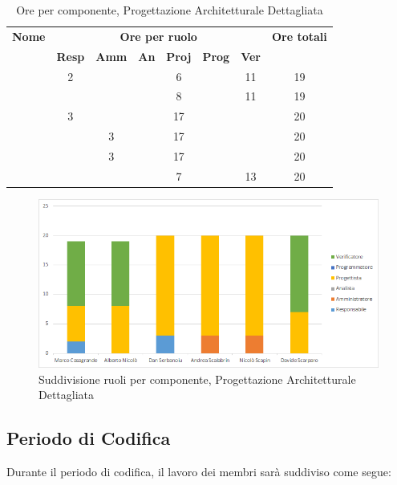 \begin{table}[H]
	\begin{center}
		\begin{tabular}{|c|c|c|c|c|c|c|c|}
			\hline
			\textbf{Nome} & \multicolumn{6}{c|}{\textbf{Ore per ruolo}} & \textbf{Ore totali} \\\cline{2-7}
			& \textbf{Resp} & \textbf{Amm} & \textbf{An} & \textbf{Proj} & \textbf{Prog} & \textbf{Ver} & \\
			\hline
			\MC			&	2	&		&		&	6	&		&	11	&	19	\\
			\hline
			\AN			&		&		&		&	8	&   	&	11	& 	19	\\
			\hline
			\DAN		&	3	&		&		&	17	&		&		&	20	\\
			\hline
			\AS			&		&	3	&	 	&	17	&	 	& 		&	20	\\
			\hline
			\NS 		&		&	3	&		&	17	&		& 		&	20	\\
			\hline
			\DS			& 		&		&		&	7	&		&	13	&	20	\\
			\hline
		\end{tabular}
	\end{center}
	\caption{Ore per componente, Progettazione Architetturale Dettagliata}
\end{table}

\begin{figure}[H]
	\centering
	\includegraphics[scale=0.6]{img/6-3.png}
	\caption{Suddivisione ruoli per componente, Progettazione Architetturale Dettagliata}
\end{figure}

\subsection{Periodo di Codifica}
Durante il periodo di codifica, il lavoro dei membri sarà suddiviso come segue:


